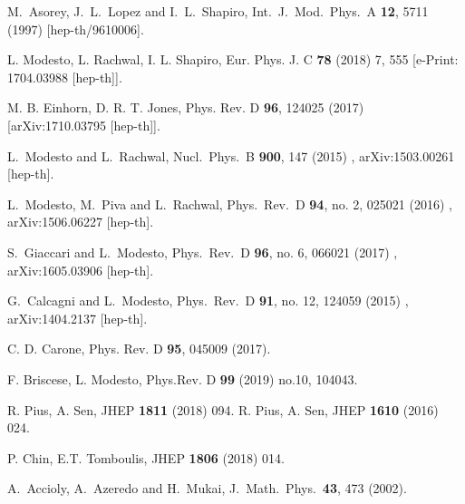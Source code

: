 \documentclass[a4paper,11pt]{article}
\begin{document}
\begin{thebibliography}{99}
M.~Asorey, J.~L.~Lopez and I.~L.~Shapiro,
Int.\ J.\ Mod.\ Phys.\ A {\bf 12}, 5711 (1997)
[hep-th/9610006].


L. Modesto, L. Rachwal, 	I. L. Shapiro, 
Eur. Phys. J. C {\bf 78} (2018) 7, 555 [e-Print: 1704.03988 [hep-th]].


M. B. Einhorn, D. R. T. Jones,
Phys. Rev. D {\bf 96}, 124025 (2017) [arXiv:1710.03795 [hep-th]].



L.~Modesto and L.~Rachwal,
Nucl.\ Phys.\ B {\bf 900}, 147 (2015)
, arXiv:1503.00261 [hep-th].

L.~Modesto, M.~Piva and L.~Rachwal,
Phys.\ Rev.\ D {\bf 94}, no. 2, 025021 (2016)
, arXiv:1506.06227 [hep-th].  

 S.~Giaccari and L.~Modesto,
Phys.\ Rev.\ D {\bf 96}, no. 6, 066021 (2017)
, arXiv:1605.03906 [hep-th].

 G.~Calcagni and L.~Modesto,
Phys.\ Rev.\ D {\bf 91}, no. 12, 124059 (2015)
, arXiv:1404.2137 [hep-th].





 C. D. Carone, Phys. Rev. D {\bf 95}, 045009 (2017).



 F. Briscese, L. Modesto, Phys.Rev. D {\bf 99} (2019) no.10, 104043.

R. Pius, A. Sen, JHEP {\bf 1811} (2018) 094.  R. Pius, A. Sen, JHEP {\bf 1610} (2016) 024. 

P. Chin, E.T. Tomboulis, JHEP {\bf 1806} (2018) 014.




A.~Accioly, A.~Azeredo and H.~Mukai,
J.\ Math.\ Phys.\  {\bf 43}, 473 (2002).



\end{thebibliography}
\end{document}

